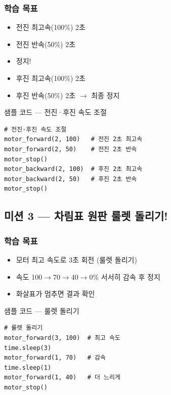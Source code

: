 \subsubsection*{학습 목표}
\begin{itemize}[leftmargin=1.4em]
  \item 전진 최고속(100\%) 2초
  \item 전진 반속(50\%) 2초
  \item 정지!
  \item 후진 최고속(100\%) 2초
  \item 후진 반속(50\%) 2초 $\rightarrow$ 최종 정지
\end{itemize}

\begin{labbox}{샘플 코드 --- 전진·후진 속도 조절}
\begin{verbatim}
# 전진·후진 속도 조절
motor_forward(2, 100)   # 전진 2초 최고속
motor_forward(2, 50)    # 전진 2초 반속
motor_stop()
motor_backward(2, 100)  # 후진 2초 최고속
motor_backward(2, 50)   # 후진 2초 반속
motor_stop()
\end{verbatim}
\end{labbox}

\subsection{미션 3 --- 차림표 원판 룰렛 돌리기!}
\label{subsec:ch07-m3}

\begin{storybox}
\end{storybox}

\subsubsection*{학습 목표}
\begin{itemize}[leftmargin=1.4em]
  \item 모터 최고 속도로 3초 회전 (룰렛 돌리기)
  \item 속도 100$\rightarrow$70$\rightarrow$40$\rightarrow$0\% 서서히 감속 후 정지
  \item 화살표가 멈추면 결과 확인
\end{itemize}

\begin{labbox}{샘플 코드 --- 룰렛 돌리기}
\begin{verbatim}
# 룰렛 돌리기
motor_forward(3, 100)  # 최고 속도
time.sleep(3)
motor_forward(1, 70)   # 감속
time.sleep(1)
motor_forward(1, 40)   # 더 느리게
motor_stop()
\end{verbatim}
\end{labbox}

